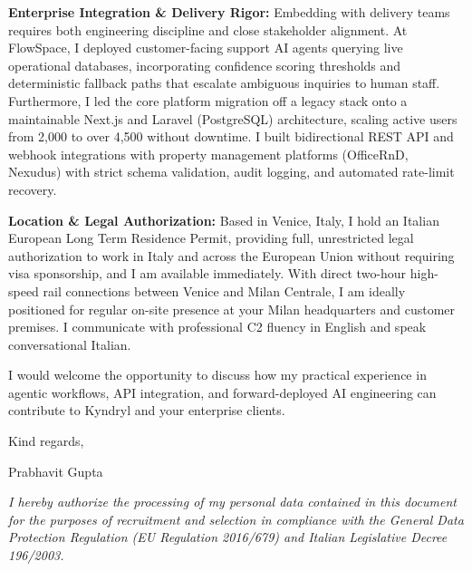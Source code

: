\documentclass[10.5pt,a4paper]{article}
\begin{document}
\textbf{Enterprise Integration \& Delivery Rigor:} Embedding with delivery teams requires both engineering discipline and close stakeholder alignment. At FlowSpace, I deployed customer-facing support AI agents querying live operational databases, incorporating confidence scoring thresholds and deterministic fallback paths that escalate ambiguous inquiries to human staff. Furthermore, I led the core platform migration off a legacy stack onto a maintainable Next.js and Laravel (PostgreSQL) architecture, scaling active users from 2,000 to over 4,500 without downtime. I built bidirectional REST API and webhook integrations with property management platforms (OfficeRnD, Nexudus) with strict schema validation, audit logging, and automated rate-limit recovery.

\textbf{Location \& Legal Authorization:} Based in Venice, Italy, I hold an Italian European Long Term Residence Permit, providing full, unrestricted legal authorization to work in Italy and across the European Union without requiring visa sponsorship, and I am available immediately. With direct two-hour high-speed rail connections between Venice and Milan Centrale, I am ideally positioned for regular on-site presence at your Milan headquarters and customer premises. I communicate with professional C2 fluency in English and speak conversational Italian.

I would welcome the opportunity to discuss how my practical experience in agentic workflows, API integration, and forward-deployed AI engineering can contribute to Kyndryl and your enterprise clients.

Kind regards,

Prabhavit Gupta

\vspace{0.4em}
{\footnotesize \textit{I hereby authorize the processing of my personal data contained in this document for the purposes of recruitment and selection in compliance with the General Data Protection Regulation (EU Regulation 2016/679) and Italian Legislative Decree 196/2003.}\par}
\end{document}
